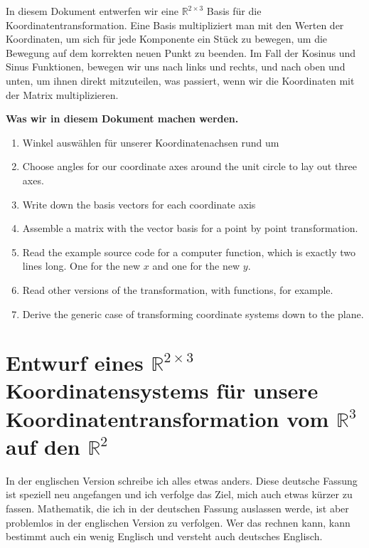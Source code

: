 \documentclass[a4paper]{article}
\begin{document}
In diesem Dokument entwerfen wir eine $\mathbb{R}^{2\times{3}}$ Basis f\"ur die Koordinatentransformation.
Eine Basis multipliziert man mit den Werten der Koordinaten, um sich f\"ur jede Komponente ein St\"uck
zu bewegen, um die Bewegung auf dem korrekten neuen Punkt zu beenden.
Im Fall der Kosinus und Sinus Funktionen, bewegen wir uns nach links und rechts, und nach oben und
unten, um ihnen direkt mitzuteilen, was passiert, wenn wir die Koordinaten mit der Matrix multiplizieren.


\textbf{Was wir in diesem Dokument machen werden.}

\begin{enumerate}
\item Winkel ausw\"ahlen f\"ur unserer Koordinatenachsen rund um
\item Choose angles for our coordinate axes around the unit circle to lay out three axes.
\item Write down the basis vectors for each coordinate axis
\item Assemble a matrix with the vector basis for a point by point transformation.
\item Read the example source code for a computer function, which is exactly two lines long. One for the new $x$ and one for the new $y$.
\item Read other versions of the transformation, with functions, for example.
\item Derive the generic case of transforming coordinate systems down to the plane.

\end{enumerate}


\section{Entwurf eines $\mathbb{R}^{2\times{3}}$ Koordinatensystems f\"ur unsere Koordinatentransformation vom $\mathbb{R}^{3}$ auf den $\mathbb{R}^{2}$}

In der englischen Version schreibe ich alles etwas anders. Diese deutsche Fassung ist speziell neu angefangen und ich verfolge das
Ziel, mich auch etwas k\"urzer zu fassen. Mathematik, die ich in der deutschen Fassung auslassen werde, ist aber problemlos in der
englischen Version zu verfolgen. Wer das rechnen kann, kann bestimmt auch ein wenig Englisch und versteht auch deutsches Englisch.
\end{document}
